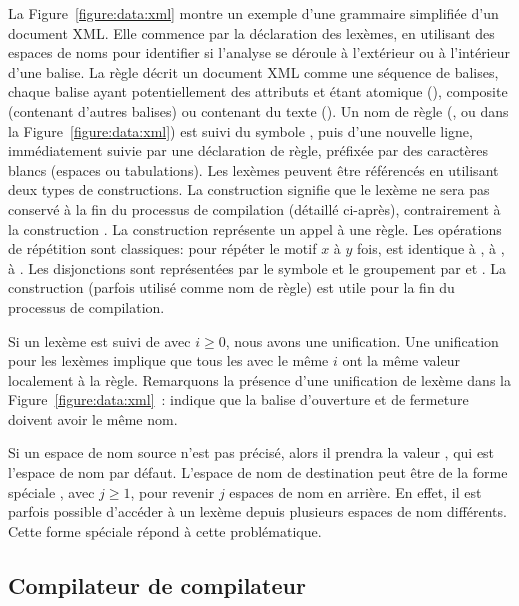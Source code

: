 La Figure~\ref{figure:data:xml} montre un exemple d'une grammaire simplifiée
d'un document XML. Elle commence par la déclaration des lexèmes, en utilisant
des espaces de noms pour identifier si l'analyse se déroule à l'extérieur ou à
l'intérieur d'une balise. La règle  décrit un document XML comme une
séquence de balises, chaque balise ayant potentiellement des attributs et étant
atomique (), composite (contenant d'autres balises) ou contenant
du texte (). Un nom de règle (,
 ou  dans la Figure~\ref{figure:data:xml}) est suivi
du symbole \code{:}, puis d'une nouvelle ligne, immédiatement suivie par une
{\strong déclaration de règle}, préfixée par des caractères blancs (espaces ou
tabulations). Les lexèmes peuvent être référencés en utilisant deux types de
constructions. La construction  signifie que le lexème ne sera
pas conservé à la fin du processus de compilation (détaillé ci-après),
contrairement à la construction . La construction 
représente un appel à une règle.  Les opérations de répétition sont classiques:
 pour répéter le motif $x$ à $y$ fois,  est identique
à , \code{+} à , \code{*} à . Les
disjonctions sont représentées par le symbole \code{\mvert} et le groupement par
\code{(} et \code{)}. La construction  (parfois utilisé comme nom
de règle) est utile pour la fin du processus de compilation.

Si un lexème est suivi de \code{[$i$]} avec $i \geq 0$, nous avons une
unification. Une unification pour les lexèmes implique que tous les
 avec le même $i$ ont la même valeur localement à la règle.
Remarquons la présence d'une unification de lexème dans la
Figure~\ref{figure:data:xml}~:  indique que la balise d'ouverture
et de fermeture doivent avoir le même nom.

Si un espace de nom source n'est pas précisé, alors il prendra la valeur
, qui est l'espace de nom par défaut. L'espace de nom de
destination peut être de la forme spéciale , avec $j
\geq 1$, pour revenir $j$ espaces de nom en arrière. En effet, il est parfois
possible d'accéder à un lexème depuis plusieurs espaces de nom différents. Cette
forme spéciale répond à cette problématique.

\subsection{Compilateur de compilateur}
\label{subsection:data:compiler-compiler}

